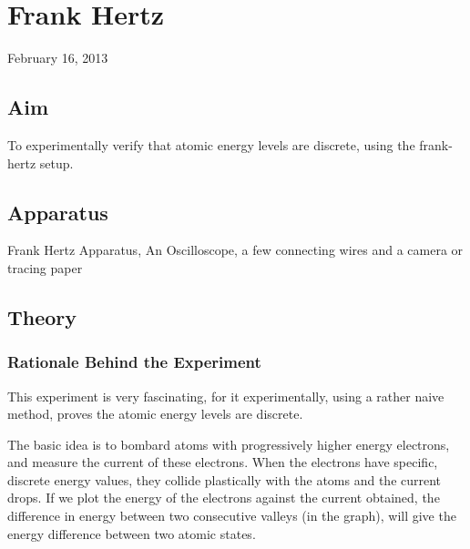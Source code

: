 \chapter{Frank Hertz}
\begin{flushright}
February 16, 2013
\end{flushright}
\section{Aim}
	To experimentally verify that atomic energy levels are discrete, using the frank-hertz setup.
\section{Apparatus}
	Frank Hertz Apparatus, An Oscilloscope, a few connecting wires and a camera or tracing paper

\section{Theory}
	\subsection{Rationale Behind the Experiment}
		This experiment is very fascinating, for it experimentally, using a rather naive method, proves the atomic energy levels are discrete.
		\par
		The basic idea is to bombard atoms with progressively higher energy electrons, and measure the current of these electrons. When the electrons have specific, discrete energy values, they collide plastically with the atoms and the current drops. If we plot the energy of the electrons against the current obtained, the difference in energy between two consecutive valleys (in the graph), will give the energy difference between two atomic states.
